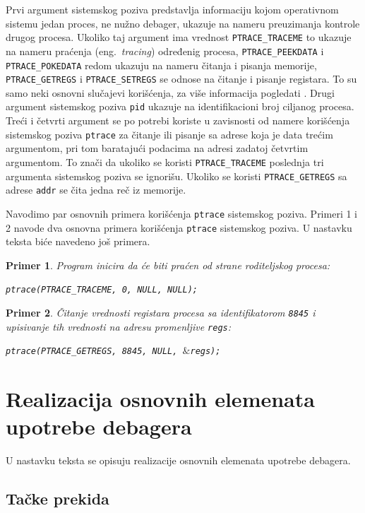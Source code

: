 \documentclass[12pt,oneside]{memoir}
\newtheorem{primer}{Primer}
\begin{document}
Prvi argument sistemskog poziva predstavlja informaciju kojom operativnom sistemu jedan proces, ne nužno debager, ukazuje na nameru preuzimanja kontrole drugog procesa. Ukoliko taj argument ima vrednost \texttt{PTRACE\_TRACEME} to ukazuje na nameru praćenja (eng.~\emph{tracing}) određenig procesa, \texttt{PTRACE\_PEEKDATA} i \texttt{PTRACE\_POKEDATA} redom ukazuju na nameru čitanja i pisanja  memorije, \texttt{PTRACE\_GETREGS} i \texttt{PTRACE\_SETREGS} se odnose na čitanje i pisanje registara. To su samo neki osnovni slučajevi korišćenja, za više informacija pogledati \cite{ptrace}. Drugi argument sistemskog poziva \texttt{pid} ukazuje na identifikacioni broj ciljanog procesa. Treći i četvrti argument se po potrebi koriste u zavisnosti od namere korišćenja sistemskog poziva \texttt{ptrace} za čitanje ili pisanje sa adrese koja je data trećim argumentom, pri tom baratajući podacima na adresi zadatoj četvrtim argumentom. To znači da ukoliko se koristi \texttt{PTRACE\_TRACEME} poslednja tri argumenta sistemskog poziva se ignorišu. Ukoliko se koristi \texttt{PTRACE\_GETREGS} sa adrese \texttt{addr} se čita jedna reč iz memorije.

Navodimo par osnovnih primera korišćenja \texttt{ptrace} sistemskog poziva. Primeri 1 i 2 navode dva osnovna primera korišćenja \texttt{ptrace} sistemskog poziva. U nastavku teksta biće navedeno još primera.

\begin{primer}
Program inicira da će biti praćen od strane roditeljskog procesa:

\texttt{ptrace(PTRACE\_TRACEME, 0, NULL, NULL);}
\end{primer}

\begin{primer}
Čitanje vrednosti registara procesa sa identifikatorom \texttt{8845} i upisivanje tih vrednosti na adresu promenljive \texttt{regs}:

\texttt{ptrace(PTRACE\_GETREGS, 8845, NULL, $\&$regs);}

\end{primer}

\section{Realizacija osnovnih elemenata upotrebe debagera}

U nastavku teksta se opisuju realizacije osnovnih elemenata upotrebe debagera.

\subsection{Tačke prekida}
\end{document}
